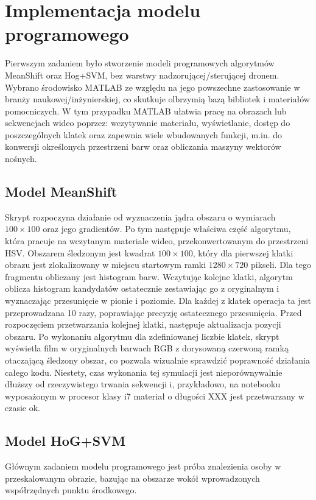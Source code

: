 \chapter{Implementacja modelu programowego}
Pierwszym zadaniem było stworzenie modeli programowych algorytmów MeanShift oraz Hog+SVM, bez warstwy nadzorującej/sterującej dronem. Wybrano środowisko MATLAB ze względu na jego powszechne zastosowanie w branży naukowej/inżynierskiej, co skutkuje olbrzymią bazą bibliotek i materiałów pomocniczych. W tym przypadku MATLAB ułatwia pracę na obrazach lub sekwencjach wideo poprzez: wczytywanie materiału, wyświetlanie, dostęp do poszczególnych klatek oraz zapewnia wiele wbudowanych funkcji, m.in. do konwersji określonych przestrzeni barw oraz obliczania maszyny wektorów nośnych.

\section{Model MeanShift}

Skrypt rozpoczyna działanie od wyznaczenia jądra obszaru o wymiarach $100 \times 100$ oraz jego gradientów. Po tym następuje właściwa część algorytmu, która pracuje na wczytanym materiale wideo, przekonwertowanym do przestrzeni HSV. Obszarem śledzonym jest kwadrat $100\times 100$, który dla pierwszej klatki obrazu jest zlokalizowany w miejscu startowym ramki $1280\times 720$ pikseli. Dla tego fragmentu obliczany jest histogram barw. Wczytując kolejne klatki, algorytm oblicza histogram kandydatów ostatecznie zestawiając go z oryginalnym i wyznaczając przesunięcie w pionie i poziomie. Dla każdej z klatek operacja ta jest przeprowadzana 10 razy, poprawiając precyzję ostatecznego przesunięcia. Przed rozpoczęciem przetwarzania kolejnej klatki, następuje aktualizacja pozycji obszaru. Po wykonaniu algorytmu dla zdefiniowanej liczbie klatek, skrypt wyświetla film w oryginalnych barwach RGB z dorysowaną czerwoną ramką otaczającą śledzony obszar, co pozwala wizualnie sprawdzić poprawność działania całego kodu. Niestety, czas wykonania tej symulacji jest nieporównywalnie dłuższy od rzeczywistego trwania sekwencji i, przykładowo, na notebooku wyposażonym w procesor klasy i7 materiał o długości XXX jest przetwarzany w czasie ok. 

\section{Model HoG+SVM}

Głównym zadaniem modelu programowego jest próba znalezienia osoby w przeskalowanym obrazie, bazując na obszarze wokół wprowadzonych współrzędnych punktu środkowego.

